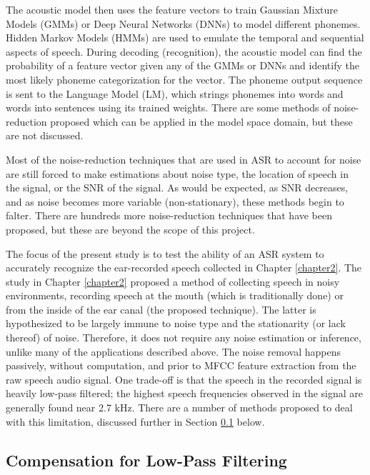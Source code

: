 The acoustic model then uses the feature vectors to train Gaussian Mixture Models (GMMs) or Deep Neural Networks (DNNs) to model different phonemes.  Hidden Markov Models (HMMs) are used to emulate the temporal and sequential aspects of speech. During decoding (recognition), the acoustic model can find the probability of a feature vector given any of the GMMs or DNNs and identify the most likely phoneme categorization for the vector.  The phoneme output sequence is sent to the Language Model (LM), which strings phonemes into words and words into sentences using its trained weights.  There are some methods of noise-reduction proposed which can be applied in the model space domain, but these are not discussed.

Most of the noise-reduction techniques that are used in ASR to account for noise are still forced to make estimations about noise type, the location of speech in the signal, or the SNR of the signal.  As would be expected, as SNR decreases, and as noise becomes more variable (non-stationary), these methods begin to falter.  There are hundreds more noise-reduction techniques that have been proposed, but these are beyond the scope of this project.

The focus of the present study is to test the ability of an ASR system to accurately recognize the ear-recorded speech collected in Chapter \ref{chapter2}.  The study in Chapter \ref{chapter2} proposed a method of collecting speech in noisy environments, recording speech at the mouth (which is traditionally done) or from the inside of the ear canal (the proposed technique).  The latter is hypothesized to be largely immune to noise type and the stationarity (or lack thereof) of noise.  Therefore, it does not require any noise estimation or inference, unlike many of the applications described above.  The noise removal happens passively, without computation, and prior to MFCC feature extraction from the raw speech audio signal.  One trade-off is that the speech in the recorded signal is heavily low-pass filtered; the highest speech frequencies observed in the signal are generally found near 2.7 kHz.  There are a number of methods proposed to deal with this limitation, discussed further in Section \ref{sec:lpf-compensation} below.


\subsection{Compensation for Low-Pass Filtering}\label{sec:lpf-compensation}

